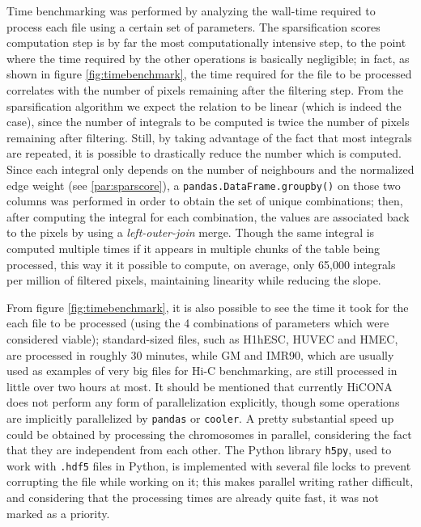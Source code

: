 Time benchmarking was performed by analyzing the wall-time required to process each file using a certain set of parameters. The sparsification scores computation step is by far the most computationally intensive step, to the point where the time required by the other operations is basically negligible; in fact, as shown in figure \ref{fig:timebenchmark}, the time required for the file to be processed correlates with the number of pixels remaining after the filtering step. From the sparsification algorithm we expect the relation to be linear (which is indeed the case), since the number of integrals to be computed is twice the number of pixels remaining after filtering. Still, by taking advantage of the fact that most integrals are repeated, it is possible to drastically reduce the number which is computed. Since each integral only depends on the number of neighbours and the normalized edge weight (see \ref{par:sparscore}), a \texttt{pandas.DataFrame.groupby()} on those two columns was performed in order to obtain the set of unique combinations; then, after computing the integral for each combination, the values are associated back to the pixels by using a \textit{left-outer-join} merge. Though the same integral is computed multiple times if it appears in multiple chunks of the table being processed, this way it it possible to compute, on average, only 65,000 integrals per million of filtered pixels, maintaining linearity while reducing the slope.

From figure \ref{fig:timebenchmark}, it is also possible to see the time it took for the each file to be processed (using the 4 combinations of parameters which were considered viable); standard-sized files, such as H1hESC, HUVEC and HMEC, are processed in roughly 30 minutes, while GM and IMR90, which are usually used as examples of very big files for Hi-C benchmarking, are still processed in little over two hours at most. It should be mentioned that currently HiCONA does not perform any form of parallelization explicitly, though some operations are implicitly parallelized by \texttt{pandas} or \texttt{cooler}. A pretty substantial speed up could be obtained by processing the chromosomes in parallel, considering the fact that they are independent from each other. The Python library \texttt{h5py}, used to work with \texttt{.hdf5} files in Python, is implemented with several file locks to prevent corrupting the file while working on it; this makes parallel writing rather difficult, and considering that the processing times are already quite fast, it was not marked as a priority.

